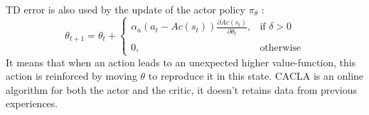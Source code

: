 TD error is also used by the update of the actor policy $\pi_\theta$ :
\begin{equation}
 \theta_{t+1} = \theta_t + 
 \begin{cases}
 \alpha_a (a_t - Ac(s_t))
 \frac{\partial Ac(s_t)}{\partial \theta_t} , & \text{if } \delta > 0\\ \\
 0, & \text{otherwise}
 \end{cases}
\end{equation}
It means that when an action leads to an unexpected higher value-function, this action is reinforced by moving $\theta$ to reproduce it in this state.
CACLA is an online algorithm for both the actor and the critic, it doesn't retains data from previous experiences. %




